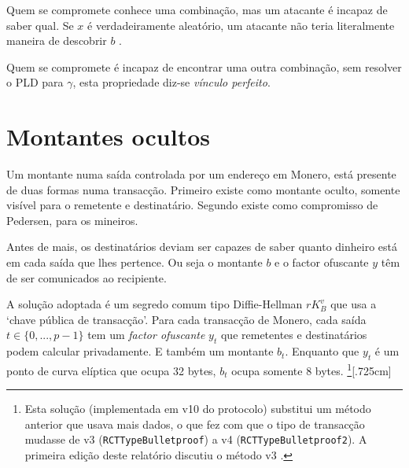 Quem se compromete conhece uma combinação, mas um atacante é incapaz de saber qual. Se $x$ é verdadeiramente aleatório, um atacante não teria literalmente maneira de descobrir $b$ \cite{maxwell-ct, SCOZZAFAVA1993313}.  

Quem se compromete é incapaz de encontrar uma outra combinação, sem resolver o PLD para $\gamma$, esta propriedade diz-se {\em vínculo perfeito}.  

\section{Montantes ocultos}
\label{sec:pedersen_monero}

Um montante numa saída controlada por um endereço em Monero, está presente de duas formas numa transacção. Primeiro existe como montante oculto, somente visível para o remetente e destinatário. Segundo existe como compromisso de Pedersen, para os mineiros.

Antes de mais, os destinatários deviam ser capazes de saber quanto dinheiro está em cada saída que lhes pertence. Ou seja o montante $b$ e o factor ofuscante $y$ têm de ser comunicados ao recipiente.

A solução adoptada é um segredo comum tipo Diffie-Hellman $r K_B^v$ que usa a `chave pública de transacção'.
Para cada transacção de Monero, cada saída $t \in \{0, ..., p-1\}$ tem um {\em factor ofuscante} $y_t$ que remetentes e destinatários podem calcular privadamente. E também um montante $b_t$. \newline
Enquanto que $y_t$ é um ponto de curva elíptica que ocupa 32 bytes, $b_t$ ocupa somente 8 bytes.  
\footnote{Esta solução (implementada em v10 do protocolo) substitui um método anterior que usava mais dados, o que fez com que o tipo de transacção mudasse de v3 ({\tt RCTTypeBulletproof}) a v4 ({\tt RCTTypeBulletproof2}). A primeira edição deste relatório discutiu o método v3 \cite{ztm-1}.}[.725cm]


